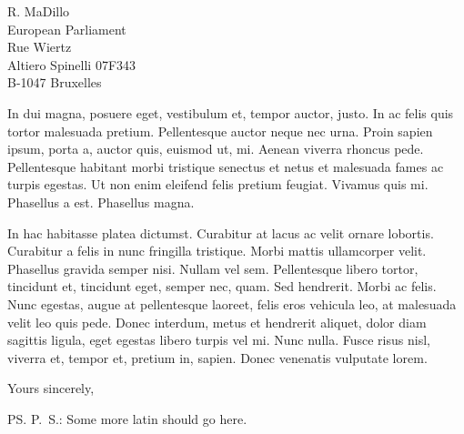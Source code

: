 \documentclass[a4paper,12pt]{letter}
\begin{document}
\begin{letter}{
    R. MaDillo\\
    European Parliament\\
    Rue Wiertz\\
    Altiero Spinelli 07F343\\
    B-1047 Bruxelles 
  }
{  In dui magna, posuere eget, vestibulum et, tempor auctor, justo. In ac felis 
  quis tortor malesuada pretium. Pellentesque auctor neque nec urna. Proin 
  sapien ipsum, porta a, auctor quis, euismod ut, mi. Aenean viverra rhoncus 
  pede. Pellentesque habitant morbi tristique senectus et netus et malesuada 
  fames ac turpis egestas. Ut non enim eleifend felis pretium feugiat. Vivamus 
  quis mi. Phasellus a est. Phasellus magna.

  In hac habitasse platea dictumst. Curabitur at lacus ac velit ornare lobortis. 
  Curabitur a felis in nunc fringilla tristique. Morbi mattis ullamcorper velit. 
  Phasellus gravida semper nisi. Nullam vel sem. Pellentesque libero tortor, 
  tincidunt et, tincidunt eget, semper nec, quam. Sed hendrerit. Morbi ac felis. 
  Nunc egestas, augue at pellentesque laoreet, felis eros vehicula leo, at 
  malesuada velit leo quis pede. Donec interdum, metus et hendrerit aliquet, 
  dolor diam sagittis ligula, eget egestas libero turpis vel mi. Nunc nulla. 
  Fusce risus nisl, viverra et, tempor et, pretium in, sapien. Donec venenatis 
  vulputate lorem.
}

  \closing{Yours sincerely,}
%
  \ps{P.\ S.: Some more latin should go here.}

  \vspace{1cm}
  \begingroup
  \def\enotesize{\small}
  \def\enoteheading{\Large \textsc{Notes}}
  \theendnotes
  \endgroup
\end{letter}
\end{document}
